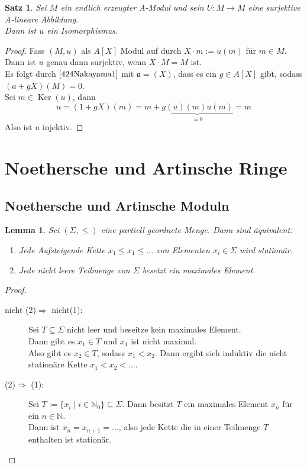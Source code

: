 \documentclass[10pt,a4paper]{article}
\newcommand{\N}{\ensuremath{\mathbb{N}}}
\newcommand{\Ker}{\ensuremath{\operatorname{Ker}}}
\newcounter{thm}[section]
\theoremstyle{definition}
\theoremstyle{plain}
\newtheorem{lem}[thm]{Lemma}
\newtheorem{satz}[thm]{Satz}
\theoremstyle{remark}
\begin{document}
\begin{satz}
	\label{427}Sei $M$ ein endlich erzeugter A-Modul und sein $U:M\rightarrow M$ eine surjektive A-lineare Abbildung.\\
	Dann ist $u$ ein Isomorphismus.
\end{satz}
\begin{proof}
	Fass $(M,u)$ als $A[X]$ Modul auf durch $X\cdot m:=u(m)$ für $m\in M$.\\
	Dann ist $u$ genau dann surjektiv, wenn $X\cdot M=M$ ist.\\
	Es folgt durch $\ref{424Nakayama1}$ mit $\mathfrak a=(X)$, dass es ein $g\in A[X]$ gibt, sodass $(a+gX)(M)=0$.\\
	Sei $m\in\Ker(u)$, dann
	\[u=(1+gX)(m)=m+\underbrace{g(u)(m)u(m)}_{=0}=m\]
	Also ist $u$ injektiv.
\end{proof}




\section{Noethersche und Artinsche Ringe}
\subsection{Noethersche und Artinsche Moduln}
\begin{lem}\label{501lem}
	Sei $(\Sigma,\leq)$ eine partiell geordnete Menge. Dann sind äquivalent:
	\begin{enumerate}
		\item Jede Aufsteigende Kette $x_1\leq x_1\leq...$ von Elementen $x_i\in\Sigma$ wird stationär.
	\item Jede nicht leere Teilmenge von $\Sigma$ besetzt ein maximales Element.
	\end{enumerate}
\end{lem}
\begin{proof}
	\begin{description}
		\item[nicht (2)$\Rightarrow$ nicht(1):] Sei $T\subseteq\Sigma$ nicht leer und beseitze kein maximales Element.\\
		Dann gibt es $x_1\in T$ und $x_1$ ist nicht maximal.\\
		Also gibt es $x_2\in T$, sodass $x_1< x_2$. Dann ergibt sich induktiv die nicht stationäre Kette $x_1<x_2<...$.
		\item[(2)$\Rightarrow$ (1):] Sei $T:=\{x_i\mid i\in\N_0\}\subseteq \Sigma$. Dann besitzt $T$ ein maximales Element $x_n$ für ein $n\in\N$.\\
		Dann ist $x_n=x_{n+1}=...$, also jede Kette die in einer Teilmenge $T$ enthalten ist stationär.
	\end{description}
\end{proof}
\end{document}
